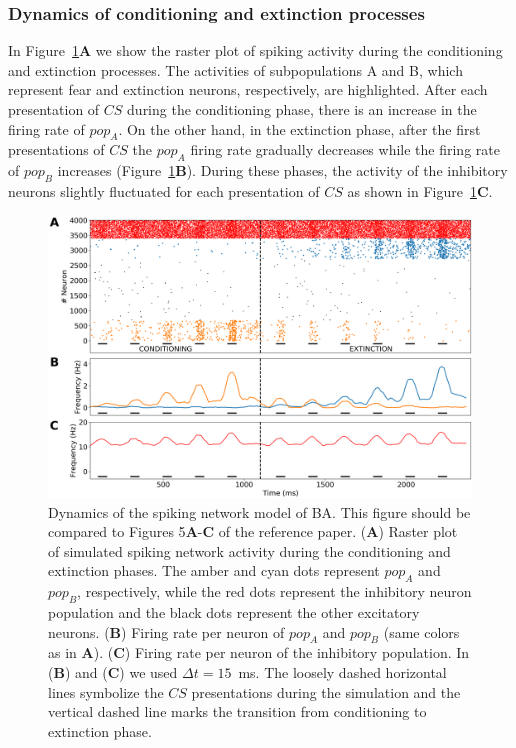 \subsubsection{Dynamics of conditioning and extinction processes}

In Figure~\ref{fig:raster_COND_EXT}\textbf{A} we show the raster plot of spiking activity during the conditioning and extinction processes. The activities of subpopulations A and B, which represent fear and extinction neurons, respectively, are highlighted. After each presentation of $CS$ during the conditioning phase, there is an increase in the firing rate of $pop_A$. On the other hand, in the extinction phase, after the first presentations of $CS$ the $pop_A$ firing rate gradually decreases while the firing rate of $pop_B$  increases (Figure~\ref{fig:raster_COND_EXT}\textbf{B}). During these phases, the activity of the inhibitory neurons slightly fluctuated for each presentation of $CS$ as shown in Figure~\ref{fig:raster_COND_EXT}\textbf{C}.

\begin{figure}[!ht]
\centering
\includegraphics[width=1.0\textwidth]{figures/COND_EXT_raster.png}
\caption{\label{fig:raster_COND_EXT} Dynamics of the spiking network model of BA. This figure should be compared to Figures 5\textbf{A}-\textbf{C} of the reference paper. (\textbf{A}) Raster plot of simulated spiking network activity during the conditioning and extinction phases. The amber and cyan dots represent $pop_A$ and $pop_B$, respectively, while the red dots represent the inhibitory neuron population and the black dots represent the other excitatory neurons. (\textbf{B}) Firing rate per neuron of $pop_A$ and $pop_B$ (same colors as in \textbf{A}). (\textbf{C}) Firing rate per neuron of the inhibitory population. In (\textbf{B}) and (\textbf{C}) we used $\Delta t = 15$~ms. The loosely dashed horizontal lines symbolize the $CS$ presentations during the simulation and the vertical dashed line marks the transition from conditioning to extinction phase.}
\end{figure}
\FloatBarrier

